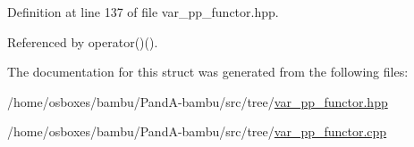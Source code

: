 Definition at line 137 of file var\+\_\+pp\+\_\+functor.\+hpp.



Referenced by operator()().



The documentation for this struct was generated from the following files\+:\begin{DoxyCompactItemize}
\item 
/home/osboxes/bambu/\+Pand\+A-\/bambu/src/tree/\hyperlink{var__pp__functor_8hpp}{var\+\_\+pp\+\_\+functor.\+hpp}\item 
/home/osboxes/bambu/\+Pand\+A-\/bambu/src/tree/\hyperlink{var__pp__functor_8cpp}{var\+\_\+pp\+\_\+functor.\+cpp}\end{DoxyCompactItemize}
